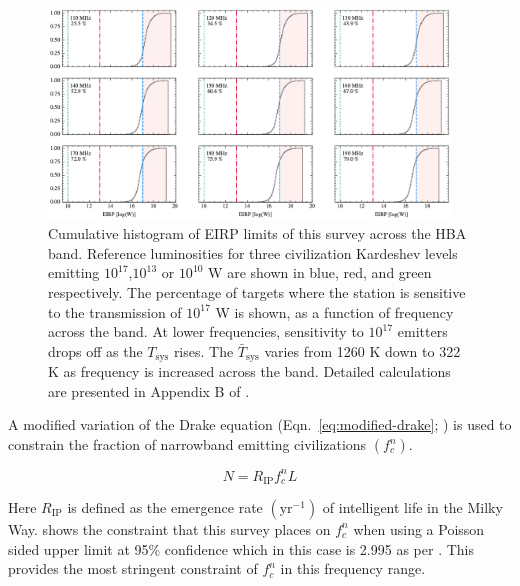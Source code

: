 \begin{figure}
    \centering
    \includegraphics[width = 0.95\textwidth]{figs/EIRP_hist_plot.pdf}
    \caption{Cumulative histogram of EIRP limits of this survey across the HBA band. Reference luminosities for three civilization Kardeshev levels emitting $10^{17}$,$10^{13}$ or $10^{10}$ W are shown in blue, red, and green respectively. The percentage of targets where the station is sensitive to the transmission of $10^{17}$ W is shown, as a function of frequency across the band. At lower frequencies, sensitivity to $10^{17}$ emitters drops off as the $T_{\text{sys}}$ rises. The $\bar T_{\text{sys}}$ varies from 1260 K down to 322 K as frequency is increased across the band. Detailed calculations are presented in Appendix B of \cite{johnson_simultaneous_2023}.}
    \label{fig:EIRP-limits}
\end{figure}

A modified variation of the Drake equation (Eqn.~\ref{eq:modified-drake}; \citealt{Sagan1966, 2022VishalPulsed}) is used to constrain the fraction of narrowband emitting civilizations $(f_c^n)$. 

\begin{equation}
    N =  R_{\text{IP}}f^n_cL
    \label{eq:modified-drake}
\end{equation}

Here  $R_{\text{IP}}$ is defined as the emergence rate $(\text{yr}^{-1})$ of intelligent life in the Milky Way.   shows the constraint that this survey places on $f_c^n$ when using a Poisson sided upper limit at 95\% confidence which in this case is 2.995 as per \cite{1986_Poission_tables}. This provides the most stringent constraint of $f^n_c$ in this frequency range. \

